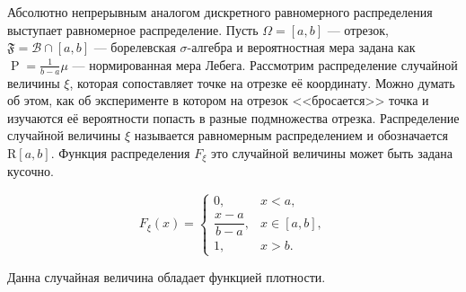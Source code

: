 \documentclass[12pt]{article}
\numberwithin{theorem}{section}
\theoremstyle{definition}
\newcommand{\defin}[2]{\hypertarget{#2}{{\color{red} #1}}}
\newcommand{\calB}{\mathcal{B}}
\newcommand{\prob}{\operatorname{P}}
\newcommand{\events}{\mathfrak{F}}
\begin{document}
	Абсолютно непрерывным аналогом дискретного равномерного распределения выступает равномерное распределение.
	Пусть $ \Omega = [a,b] $ --- отрезок, $ \events = \calB \cap [a,b] $ --- борелевская $ \sigma $-алгебра
	и вероятностная мера задана как $ \prob = \tfrac{1}{b - a}\mu $ --- нормированная мера Лебега.
	Рассмотрим распределение случайной величины $ \xi $, которая сопоставляет точке на отрезке её координату.
	Можно думать об этом, как об эксперименте в котором на отрезок <<бросается>> точка
	и изучаются её вероятности попасть в разные подмножества отрезка.
	Распределение случайной величины $ \xi $ называется \defin{равномерным распределением}{uniform-distribution}
	и обозначается $ \mathrm{R}[a,b] $.
	Функция распределения $ F_\xi $ это случайной величины может быть задана кусочно.
	\begin{center}
		\begin{minipage}{0.45\textwidth}
			\[
			F_\xi(x) =
			\begin{cases}
				0, & x < a, \\
				\dfrac{x - a}{b - a}, & x \in [a, b], \\
				1, & x > b.
			\end{cases}
			\]
		\end{minipage}
		\def\a{1}
		\def\b{4}
		\begin{minipage}{0.5\textwidth}
		\end{minipage}
	\end{center}
	Данна случайная величина обладает функцией плотности.
\end{document}
